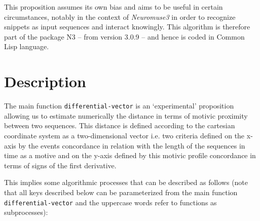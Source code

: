 \bigskip

This proposition assumes its own bias and aims to be useful in certain circumstances, notably in the context of \textsl{Neuromuse3} in order to recognize snippets as input sequences and interact knowingly. This algorithm is therefore part of the package N3 -- from version 3.0.9 -- and hence is coded in Common Lisp language. 

\section{Description}

The main function \texttt{differential-vector} is an `experimental' proposition allowing us to estimate numerically the distance in terms of motivic proximity between two sequences. This distance is defined according to the cartesian coordinate system as a two-dimensional vector i.e. two criteria defined on the x-axis by the events concordance in relation with the length of the sequences in time as a motive and on the y-axis defined by this motivic profile concordance in terms of signs of the first derivative. 

\bigskip

This implies some algorithmic processes that can be described as follows (note that all keys described below can be parameterized from the main function \texttt{differential-vector} and the uppercase words refer to functions as subprocesses):

